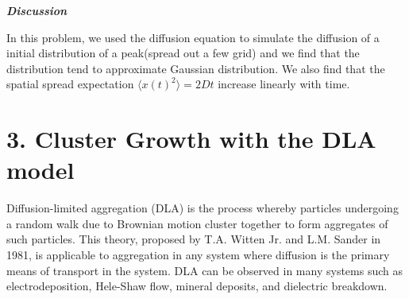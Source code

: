 \documentclass[aps,prl,preprint,superscriptaddress]{revtex4}
\begin{document}
\begin{enumerate}
\textbf{\textit{Discussion}}

In this problem, we used the diffusion equation to simulate the diffusion of a initial distribution of a peak(spread out a few grid) and we find that the distribution tend to approximate Gaussian distribution. We also find that the spatial spread expectation $\langle x(t)^2\rangle=2Dt$ increase linearly with time.
\end{enumerate}

	\section{3. Cluster Growth with the DLA model}

Diffusion-limited aggregation (DLA) is the process whereby particles undergoing a random walk due to Brownian motion cluster together to form aggregates of such particles. This theory, proposed by T.A. Witten Jr. and L.M. Sander in 1981, is applicable to aggregation in any system where diffusion is the primary means of transport in the system. DLA can be observed in many systems such as electrodeposition, Hele-Shaw flow, mineral deposits, and dielectric breakdown.
\end{document}

